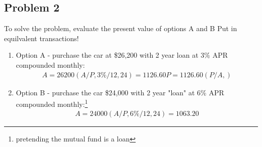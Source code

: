 \documentclass{report} %
\begin{document}
\subsection*{Problem 2} 
To solve the problem, evaluate the present value of options A and B 
Put in equilvalent transactions!
\begin{enumerate}
    \item Option A - purchase the car at \$26,200 with 2 year loan at 3\% APR compounded monthly: 
    \begin{equation*}
        \begin{aligned}
            A = 26200(A/P,3\%/12,24) = 1126.60
            P = 1126.60(P/A,)
        \end{aligned}
    \end{equation*}
    \item Option B - purchase the car \$24,000 with 2 year "loan" at 6\% APR compounded monthly:\footnote{pretending the mutual fund is a loan}
    \begin{equation*}
        \begin{aligned}
            A = 24000(A/P,6\%/12,24) = 1063.20
        \end{aligned}
    \end{equation*}
\end{enumerate}
\end{document}
